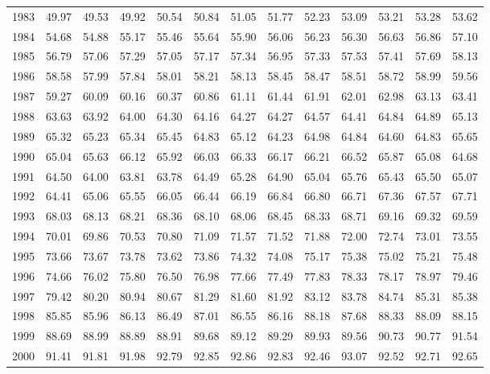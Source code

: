 \begin{longtable}{rrrrrrrrrrrrr}
  1983 & 49.97 & 49.53 & 49.92 & 50.54 & 50.84 & 51.05 & 51.77 & 52.23 & 53.09 & 53.21 & 53.28 & 53.62 \\ 
  1984 & 54.68 & 54.88 & 55.17 & 55.46 & 55.64 & 55.90 & 56.06 & 56.23 & 56.30 & 56.63 & 56.86 & 57.10 \\ 
  1985 & 56.79 & 57.06 & 57.29 & 57.05 & 57.17 & 57.34 & 56.95 & 57.33 & 57.53 & 57.41 & 57.69 & 58.13 \\ 
  1986 & 58.58 & 57.99 & 57.84 & 58.01 & 58.21 & 58.13 & 58.45 & 58.47 & 58.51 & 58.72 & 58.99 & 59.56 \\ 
  1987 & 59.27 & 60.09 & 60.16 & 60.37 & 60.86 & 61.11 & 61.44 & 61.91 & 62.01 & 62.98 & 63.13 & 63.41 \\ 
  1988 & 63.63 & 63.92 & 64.00 & 64.30 & 64.16 & 64.27 & 64.27 & 64.57 & 64.41 & 64.84 & 64.89 & 65.13 \\ 
  1989 & 65.32 & 65.23 & 65.34 & 65.45 & 64.83 & 65.12 & 64.23 & 64.98 & 64.84 & 64.60 & 64.83 & 65.65 \\ 
  1990 & 65.04 & 65.63 & 66.12 & 65.92 & 66.03 & 66.33 & 66.17 & 66.21 & 66.52 & 65.87 & 65.08 & 64.68 \\ 
  1991 & 64.50 & 64.00 & 63.81 & 63.78 & 64.49 & 65.28 & 64.90 & 65.04 & 65.76 & 65.43 & 65.50 & 65.07 \\ 
  1992 & 64.41 & 65.06 & 65.55 & 66.05 & 66.44 & 66.19 & 66.84 & 66.80 & 66.71 & 67.36 & 67.57 & 67.71 \\ 
  1993 & 68.03 & 68.13 & 68.21 & 68.36 & 68.10 & 68.06 & 68.45 & 68.33 & 68.71 & 69.16 & 69.32 & 69.59 \\ 
  1994 & 70.01 & 69.86 & 70.53 & 70.80 & 71.09 & 71.57 & 71.52 & 71.88 & 72.00 & 72.74 & 73.01 & 73.55 \\ 
  1995 & 73.66 & 73.67 & 73.78 & 73.62 & 73.86 & 74.32 & 74.08 & 75.17 & 75.38 & 75.02 & 75.21 & 75.48 \\ 
  1996 & 74.66 & 76.02 & 75.80 & 76.50 & 76.98 & 77.66 & 77.49 & 77.83 & 78.33 & 78.17 & 78.97 & 79.46 \\ 
  1997 & 79.42 & 80.20 & 80.94 & 80.67 & 81.29 & 81.60 & 81.92 & 83.12 & 83.78 & 84.74 & 85.31 & 85.38 \\ 
  1998 & 85.85 & 85.96 & 86.13 & 86.49 & 87.01 & 86.55 & 86.16 & 88.18 & 87.68 & 88.33 & 88.09 & 88.15 \\ 
  1999 & 88.69 & 88.99 & 88.89 & 88.91 & 89.68 & 89.12 & 89.29 & 89.93 & 89.56 & 90.73 & 90.77 & 91.54 \\ 
  2000 & 91.41 & 91.81 & 91.98 & 92.79 & 92.85 & 92.86 & 92.83 & 92.46 & 93.07 & 92.52 & 92.71 & 92.65 \\ 

\end{longtable}
